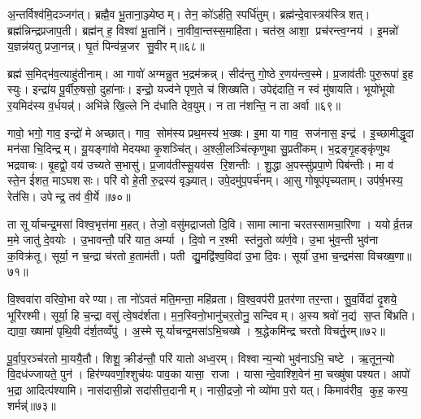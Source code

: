 अ॒न्तर्विश्व॑मि॒दञ्जग॑त्। ब्रह्मै॒व भू॒ताना॒ञ्ज्येष्ठम्। तेन॒ को॑ऽर्\mbox{}हति॒ स्पर्धि॑तुम्। ब्रह्म॑न्दे॒वास्त्रय॑स्त्रिशत्। ब्रह्म॑न्निन्द्रप्रजाप॒ती। ब्रह्म॑न् ह॒ विश्वा॑ भू॒तानि॑। ना॒वीवा॒न्तस्स॒माहि॑ता। चत॑स्र॒ आशा॒ प्रच॑रन्त्व॒ग्नय॑। इ॒मन्नो॑ य॒ज्ञन्न॑यतु प्रजा॒नन्न्। घृ॒तं पिन्व॑न्न॒जर सु॒वीरम्॥६८॥

ब्रह्म॑ स॒मिद्भ॑व॒त्याहु॑तीनाम्। आ गावो॑ अग्मन्नु॒त भ॒द्रम॑क्रन्न्। सीद॑न्तु गो॒ष्ठे र॒णय॑न्त्व॒स्मे। प्र॒जाव॑तीः पुरु॒रूपा॑ इ॒ह स्युः। इन्द्रा॑य पू॒र्वीरु॒षसो॒ दुहा॑नाः। इन्द्रो॒ यज्व॑ने पृण॒ते च॑ शिख्षति। उपेद्द॑दाति॒ न स्वं मु॑षायति। भूयो॑भूयो र॒यमिद॑स्य व॒र्धयन्न्॑। अभि॑न्ने खि॒ल्ले नि द॑धाति देव॒युम्। न ता न॑शन्ति॒ न ता अर्वा॥६९॥

गावो॒ भगो॒ गाव॒ इन्द्रो॑ मे अच्छात्। गाव॒ सोम॑स्य प्रथ॒मस्य॑ भ॒ख्षः। इ॒मा या गाव॒ सज॑नास॒ इन्द्र॑। इ॒च्छामीद्धृ॒दा मन॑सा चि॒दिन्द्रम्। यू॒यङ्गा॑वो मेदयथा कृ॒शञ्चि॑त्। अ॒श्ली॒लञ्चि॑त्कृणुथा सु॒प्रती॑कम्। भ॒द्रङ्गृ॒हङ्कृ॑णुथ भद्रवाचः। बृ॒हद्वो॒ वय॑ उच्यते स॒भासु॑। प्र॒जाव॑तीस्सू॒यव॑स रि॒शन्तीः। शु॒द्धा अ॒पस्सु॑प्रपा॒णे पिब॑न्तीः। मा व॑ स्ते॒न ई॑शत॒ माऽघशसः। परि॑ वो हे॒ती रु॒द्रस्य॑ वृञ्ज्यात्। उपे॒दमु॑प॒पर्च॑नम्। आ॒सु गोषूप॑पृच्यताम्। उप॑र्\mbox{}ष॒भस्य॒ रेत॑सि। उपेन्द्र॒ तव॑ वी॒र्ये॥७०॥\anuvakamend[च॒रा॒मि॒ कनी॑यो॒ऽन्यानर्पि॑ता प॒दानि॒ यज्व॑सु हवामहे वि॒ष्ठा लो॒कास्सु॒वीर॒मर्वा॒ पिब॑न्ती॒ष्षट्च॑]

ता सूर्याचन्द्र॒मसा॑ विश्व॒भृत्त॑मा म॒हत्। तेजो॒ वसु॑मद्राजतो दि॒वि। सामात्माना चरतस्सामचा॒रिणा। ययोर्व्र॒तन्न म॒मे जातु॑ दे॒वयोः। उ॒भावन्तौ॒ परि॑ यात॒ अर्म्या। दि॒वो न र॒श्मी स्त॑नु॒तो व्य॑र्ण॒वे। उ॒भा भु॑व॒न्ती भुव॑ना क॒विक्र॑तू। सूर्या॒ न च॒न्द्रा च॑रतो ह॒ताम॑ती। पती द्यु॒मद्वि॑श्व॒विदा॑ उ॒भा दि॒वः। सूर्या॑ उ॒भा च॒न्द्रम॑सा विचख्ष॒णा॥७१॥

वि॒श्ववा॑रा वरिवो॒भा वरेण्या। ता नो॑ऽवतं मति॒मन्ता॒ महि॑व्रता। वि॒श्व॒वप॑री प्र॒तर॑णा तर॒न्ता। सु॒व॒र्विदा॑ दृ॒शये॒ भूरि॑रश्मी। सूर्या॒ हि च॒न्द्रा वसु॑ त्वे॒षद॑र्शता। म॒न॒स्विनो॒भानु॑चर॒तोनु॒ सन्दिवम्। अ॒स्य श्रवो॑ न॒द्य॑ स॒प्त बि॑भ्रति। द्यावा॒ ख्षामा॑ पृथि॒वी द॑र्\mbox{}श॒तव्वँपु॑। अ॒स्मे सूर्याचन्द्र॒मसा॑ऽभि॒चख्षे। श्र॒द्धेकमि॑न्द्र चरतो विचर्तु॒रम्॥७२॥

पू॒र्वा॒प॒रञ्च॑रतो मा॒ययै॒तौ। शिशू॒ क्रीड॑न्तौ॒ परि॑ यातो अध्व॒रम्। विश्वान्य॒न्यो भुव॑नाऽभि॒ चष्टे। ऋ॒तून॒न्यो वि॒दध॑ज्जायते॒ पुन॑। हिर॑ण्यवर्णा॒श्शुच॑यः पाव॒का यासा॒ राजा। यासान्दे॒वाश्शि॒वेन॑ मा॒ चख्षु॑षा पश्यत। आपो॑ भ॒द्रा आदित्प॑श्यामि। नास॑दासी॒न्नो सदा॑सीत्त॒दानीम्। नासी॒द्रजो॒ नो व्यो॑मा प॒रो यत्। किमाव॑रीव॒ कुह॒ कस्य॒ शर्मन्न्॑॥७३॥

